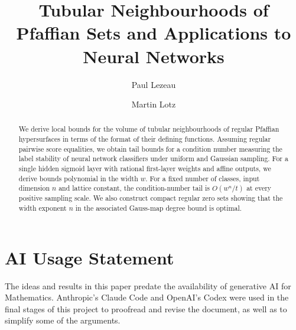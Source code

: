 \documentclass[11pt,a4paper]{amsart}
\title[Pfaffian Tubes and Neural Networks]{Tubular Neighbourhoods of Pfaffian Sets and Applications to Neural Networks}
\author{Paul Lezeau}
\author{Martin Lotz}
\date{}
\begin{document}
\begin{abstract}
We derive local bounds for the volume of tubular neighbourhoods of regular Pfaffian hypersurfaces in terms of the format of their defining functions. Assuming regular pairwise score equalities, we obtain tail bounds for a condition number measuring the label stability of neural network classifiers under uniform and Gaussian sampling. For a single hidden sigmoid layer with rational first-layer weights and affine outputs, we derive bounds polynomial in the width $w$. For a fixed number of classes, input dimension $n$ and lattice constant, the condition-number tail is $O(w^n/t)$ at every positive sampling scale. We also construct compact regular zero sets showing that the width exponent $n$ in the associated Gauss-map degree bound is optimal.
\end{abstract}

\maketitle















%

%

%

%

%

\section*{AI Usage Statement}
The ideas and results in this paper predate the availability of generative AI for Mathematics. 
Anthropic's Claude Code and OpenAI's Codex were used in the final stages of this project to proofread and revise the document, as well as to simplify some of the arguments.

\raggedbottom


\end{document}

